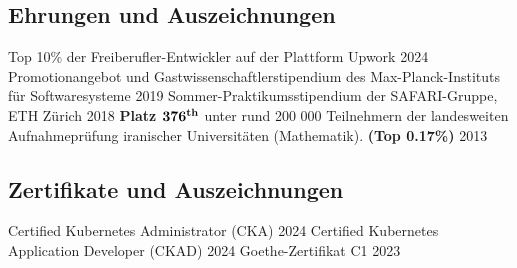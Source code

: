 \documentclass[../main.tex]{subfiles}
\begin{document}
\begin{category}
\section{Ehrungen und Auszeichnungen}
    \citembullet  Top 10\% der Freiberufler-Entwickler auf der Plattform Upwork \hfill 2024
	\citembullet  Promotionangebot und Gastwissenschaftlerstipendium des Max-Planck-Instituts für Softwaresysteme \hfill 2019
	\citembullet  Sommer-Praktikumsstipendium der SAFARI-Gruppe, ETH Zürich \hfill 2018
    \citembullet \textbf{Platz $\bf376^{th}$} unter rund 200 000 Teilnehmern der landesweiten Aufnahmeprüfung iranischer 
    Universitäten (Mathematik). \textbf{(Top 0.17\%)} \hfill 2013
\end{category}

\begin{category}
\section{Zertifikate und Auszeichnungen}
    \citembullet Certified Kubernetes Administrator (CKA) \hfill 2024
    \citembullet Certified Kubernetes Application Developer (CKAD) \hfill 2024
    \citembullet Goethe-Zertifikat C1 \hfill 2023
\end{category}
\end{document}

